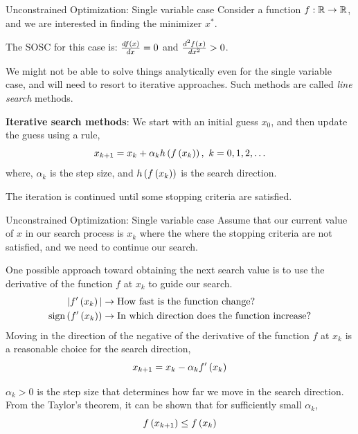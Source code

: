 \documentclass[aspectratio=169]{beamer}
\def\mb{\ensuremath\mathbb}
\def\lp{\ensuremath\left(}
\def\rp{\ensuremath\right)}
\def\R{\ensuremath\mb{R}}
\newcommand{\ct}[1]{\lp #1\rp}
\begin{document}
\begin{frame}{Unconstrained Optimization: Single variable case}
  Consider a function $f: \R \to \R$, and we are interested in finding the minimizer $x^*$.
  \vspace{0.25cm}

  The SOSC for this case is: $\frac{df\ct{x}}{dx} = 0$ and $\frac{d^2f\ct{x}}{dx^2} > 0$.
  \vspace{0.25cm}

  We might not be able to solve things analytically even for the single variable case, and will need to resort to iterative approaches. Such methods are called \textit{line search} methods.
  \vspace{0.25cm}

  \textbf{Iterative search methods}: We start with an initial guess $x_0$, and then update the guess using a rule,
  \[ x_{k+1} = x_k + \alpha_k h\ct{f\ct{x_k}}, \,\, k = 0, 1, 2, \ldots \]
  where, $\alpha_k$ is the step size, and $h\ct{f\ct{x_k}}$ is the search direction.
  \vspace{0.25cm}

  The iteration is continued until some stopping criteria are satisfied.
\end{frame}


\begin{frame}{Unconstrained Optimization: Single variable case}
  Assume that our current value of $x$ in our search process is $x_k$ where the  where the stopping criteria are not satisfied, and we need to continue our search.
  \vspace{0.25cm}

  One possible approach toward obtaining the next search value is to use the derivative of the function $f$ at $x_k$ to guide our search. 
  \[ 
    \begin{split} 
    \vert f'\ct{x_k}\vert &\rightarrow \text{How fast is the function change?} \\
    \text{sign}\ct{f'\ct{x_k}} &\rightarrow \text{In which direction does the function increase?} \\
    \end{split}
  \]
  Moving in the direction of the negative of the derivative of the function $f$ at $x_k$ is a reasonable choice for the search direction,
  \[ x_{k+1} = x_k - \alpha_k f'\ct{x_k} \]

  $\alpha_k > 0$ is the step size that determines how far we move in the search direction. From the Taylor's theorem, it can be shown that for sufficiently small $\alpha_k$,
  \[ f\ct{x_{k+1}} \leq f\ct{x_{k}} \]
\end{frame}
\end{document}
